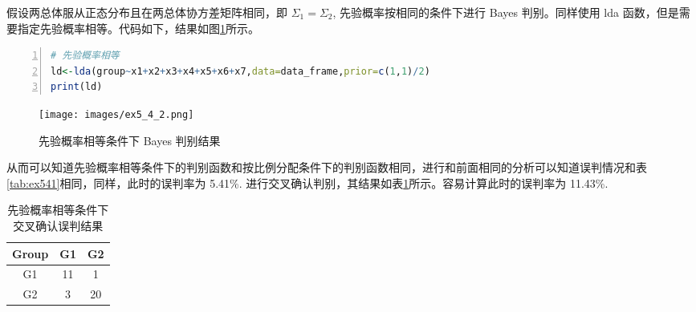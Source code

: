 \documentclass{ctexrep}
\begin{document}
假设两总体服从正态分布且在两总体协方差矩阵相同，即 $\Sigma_1=\Sigma_2$, 先验概率按相同的条件下进行 Bayes 判别。同样使用 lda 函数，但是需要指定先验概率相等。代码如下，结果如图\ref{fig:ex542}所示。
\begin{lstlisting}[language=R, numbers=left, numberstyle=\tiny]
# 先验概率相等
ld<-lda(group~x1+x2+x3+x4+x5+x6+x7,data=data_frame,prior=c(1,1)/2)
print(ld)
\end{lstlisting}
\begin{figure}[h!]
\begin{center}
\texttt{[image: images/ex5\_4\_2.png]}
\end{center}
\caption{先验概率相等条件下 Bayes 判别结果}
\label{fig:ex542}
\end{figure}

从而可以知道先验概率相等条件下的判别函数和按比例分配条件下的判别函数相同，进行和前面相同的分析可以知道误判情况和表\ref{tab:ex541}相同，同样，此时的误判率为 5.41\%. 进行交叉确认判别，其结果如表\ref{tab:ex544}所示。容易计算此时的误判率为 11.43\%.
\begin{table}[ht!]
\begin{center}
\begin{tabular}{c|cc}
Group & G1 & G2 \\
\hline
G1 & 11 & 1 \\
G2 & 3 & 20
\end{tabular}
\end{center}
\caption{先验概率相等条件下交叉确认误判结果}
\label{tab:ex544}
\end{table}
\end{document}
